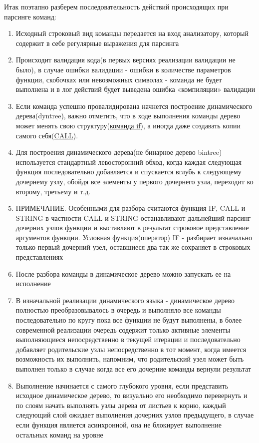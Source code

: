 \documentclass[../index.tex]{subfiles}
\begin{document}
Итак поэтапно разберем последовательность действий происходящих при парсинге команд:
\begin{enumerate}
    \item Исходный строковый вид команды передается на вход анализатору, который содержит в себе регулярные выражения для парсинга
    \item Происходит валидация кода(в первых версиях реализации валидации не было), в случае ошибки валидации - ошибки в количестве параметров функции, скобочках или невозможных символах - команда не будет выполнена и в лог действий будет выведена ошибка «компиляции» валидации
    \item Если команда успешно провалидирована начнется построение динамического дерева(\gls{dyntree}), важно отметить, что в ходе выполнения команды дерево может менять свою структуру(\hyperref[sec:fif]{команда if}), а иногда даже создавать копии самого себя(\hyperref[sec:fcall]{CALL}). 
    \item Для построения динамического дерева(не бинарное дерево \gls{bintree}) используется стандартный левосторонний обход, когда каждая следующая функция последовательно добавляется и спускается вглубь к следующему дочернему узлу, обойдя все элементы у первого дочернего узла, переходит ко второму, третьему и т.д.
    \item ПРИМЕЧАНИЕ. Особенными для разбора считаются функция IF, CALL и STRING в частности CALL и STRING останавливают дальнейший парсинг дочерних узлов функции и выставляют в результат строковое представление аргументов функции. Условная функция(оператор) IF - разбирает изначально только первый дочерний узел, оставшиеся два так же сохраняет в строковых представлениях
    \item После разбора команды в динамическое дерево можно запускать ее на исполнение 
    \item В изначальной реализации динамического языка - динамическое дерево полностью преобразовывалось в очередь и выполняло все команды последовательно по кругу пока все функции не будут выполнены, в более современной реализации очередь содержит только активные элементы выполняющиеся непосредственно в текущей итерации и последовательно добавляет родительские узлы непосредственно в тот момент, когда имеется возможность их выполнить, напомним, что родительский узел может быть выполнен только в случае когда все его дочерние команды вернули результат
    \item Выполнение начинается с самого глубокого уровня, если представить исходное динамическое дерево, то визуально его необходимо перевернуть и по слоям начать выполнять узлы дерева от листьев к корню, каждый следующий слой ожидает выполнения дочерних узлов предыдущего, в случае если функция является асинхронной, она не блокирует выполнение остальных команд на уровне

\end{enumerate}
\end{document}
